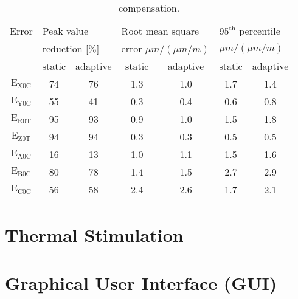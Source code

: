 \begin{table}[!htb]
\centering
\begin{threeparttable}
\caption[Statistical evaluation of the data and comparison of the methods - static vs. adaptive]{ compensation.}
\begin{tabular}{c c c c c c c}
\hline
Error  & \multicolumn{2}{l}{Peak value} \hspace{2cm} & \multicolumn{2}{l}{Root mean square} \hspace{2cm} & \multicolumn{2}{l}{$\mathrm{95^{th}}$ percentile} \vspace{-0.2cm} \\
 & \multicolumn{2}{l}{reduction [\%]} & \multicolumn{2}{l}{error $\mu m / (\mu m / m)$} & \multicolumn{2}{l}{$\mu m / (\mu m / m)$} \\
\hline
  & static & adaptive & static & adaptive & static & adaptive \\
  \hline \vspace{-0.2cm}
 $\mathrm{E_{X0C}}$ & 74 & 76 & 1.3 & 1.0 & 1.7 & 1.4 \\ \vspace{-0.2cm}
 $\mathrm{E_{Y0C}}$ & 55 & 41 & 0.3 & 0.4 & 0.6 & 0.8 \\ \vspace{-0.2cm}
 $\mathrm{E_{R0T}}$ & 95 & 93 & 0.9 & 1.0 & 1.5 & 1.8 \\ \vspace{-0.2cm}
 $\mathrm{E_{Z0T}}$ & 94 & 94 & 0.3 & 0.3 & 0.5 &  0.5\\ \vspace{-0.2cm}
 $\mathrm{E_{A0C}}$ & 16 & 13 & 1.0 & 1.1 & 1.5 & 1.6 \\ \vspace{-0.2cm}
 $\mathrm{E_{B0C}}$ & 80 & 78 & 1.4 & 1.5 & 2.7 & 2.9 \\ 
 $\mathrm{E_{C0C}}$ & 56 & 58 & 2.4 & 2.6 & 1.7 & 2.1 \\
\hline
\end{tabular}
\label{Tab:statistic_GL}
\end{threeparttable}
\end{table}


\section{Thermal Stimulation}
\label{sec:thermal_stimulation_results}

\section{Graphical User Interface (GUI)}
\label{sec:graphical_user_interface}

\